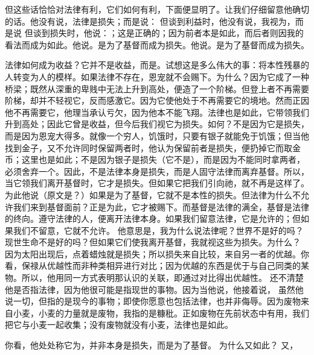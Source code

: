 但这些话恰恰对法律有利，它们如何有利，下面便显明了。让我们仔细留意他确切的话。他没有说，法律是损失；而是说： 但谈到利益时，他没有说，我视为，而是说 但谈到损失时，他说：；这是正确的；因为前者本是如此，而后者则因我的看法而成为如此。他说。是为了基督而成为损失。他说。是为了基督而成为损失。\par

法律如何成为收益？它并不是收益，而是。试想这是多么伟大的事：将本性残暴的人转变为人的模样。如果法律不存在，恩宠就不会赐下。为什么？因为它成了一种桥梁；既然从深重的卑贱中无法上升到高处，便造了一个阶梯。但登上者不再需要阶梯，却并不轻视它，反而感激它。因为它使他处于不再需要它的境地。然而正因他不再需要它，他理当承认亏欠，因为他本不能飞翔。法律也是如此，它带领我们升到高处；因此它曾是收益，但今后我们视它为损失。如何？不是因为它是损失，而是因为恩宠大得多。就像一个穷人，饥饿时，只要有银子就能免于饥饿；但当他找到金子，又不允许同时保留两者时，他认为保留前者是损失，便扔掉它而取金币；这里也是如此；不是因为银子是损失（它不是），而是因为不能同时拿两者，必须舍弃一个。因此，不是法律本身是损失，而是人固守法律而离弃基督。所以，当它领我们离开基督时，它才是损失。但如果它把我们引向祂，就不再是这样了。为此他说（原文是？）如果是为了基督，它就不是本性的损失。但法律为什么不允许我们来到基督面前？正是为此，它才被赐下。而基督是法律的满全，基督是法律的终向。遵守法律的人，便离开法律本身。如果我们留意法律，它是允许的；但如果我们不留意，它就不允许。 他意思是，我为什么说法律呢？世界不是好的吗？现世生命不是好的吗？但如果它们使我离开基督，我就视这些为损失。为什么？ 因为太阳出现后，点着蜡烛就是损失；所以损失来自比较，来自另一者的优越。你看，保禄从优越性而非种类相异进行对比；因为优越的东西是优于与自己同类的某物。所以，他用同一方式表明那认识的关联，即通过对比得出优越性。 还不清楚他是否指法律，因为他很可能是指现世的事物。因为当他说，他接着说， 虽然他说一切，但指的是现今的事物；即使你愿意也包括法律，也并非侮辱。因为废物来自小麦，小麦的力量就是废物，我指的是糠秕。正如废物在先前状态中有用，我们把它与小麦一起收集；没有废物就没有小麦，法律也是如此。\par

你看，他处处称它为，并非本身是损失，而是为了基督。 为什么又如此？ 又，\par

